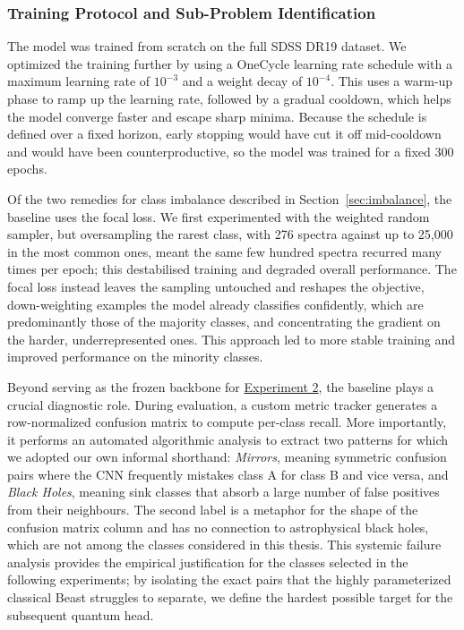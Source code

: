 \subsubsection{Training Protocol and Sub-Problem Identification}
\label{sec:baseline_training}

The model was trained from scratch on the full SDSS DR19 dataset. We optimized the training further by using a OneCycle learning rate \cite{smith2017onecyclelr} schedule with a maximum learning rate of $10^{-3}$ and a weight decay of $10^{-4}$. This uses a warm-up phase to ramp up the learning rate, followed by a gradual cooldown, which helps the model converge faster and escape sharp minima. Because the schedule is defined over a fixed horizon, early stopping would have cut it off mid-cooldown and would have been counterproductive, so the model was trained for a fixed 300 epochs.

Of the two remedies for class imbalance described in Section~\ref{sec:imbalance}, the
baseline uses the focal loss. We first experimented with the weighted random sampler, but
oversampling the rarest class, with 276 spectra against up to 25{,}000 in the most common
ones, meant the same few hundred spectra recurred many times per epoch; this destabilised
training and degraded overall performance. The focal loss
\cite{lin2018focalloss} instead leaves the sampling untouched and reshapes the objective,
down-weighting examples the model already classifies confidently, which are predominantly
those of the majority classes, and concentrating the gradient on the harder,
underrepresented ones. This approach led to more stable training and improved performance
on the minority classes.

Beyond serving as the frozen backbone for \hyperref[sec:exp2_methods]{Experiment 2}, the baseline plays a crucial diagnostic role. During evaluation, a custom metric tracker generates a row-normalized confusion matrix to compute per-class recall. More importantly, it performs an automated algorithmic analysis to extract two patterns for which we adopted our own informal shorthand: \emph{Mirrors}, meaning symmetric confusion pairs where the CNN frequently mistakes class A for class B and vice versa, and \emph{Black Holes}, meaning sink classes that absorb a large number of false positives from their neighbours. The second label is a metaphor for the shape of the confusion matrix column and has no connection to astrophysical black holes, which are not among the classes considered in this thesis. This systemic failure analysis provides the empirical justification for the classes selected in the following experiments; by isolating the exact pairs that the highly parameterized classical Beast struggles to separate, we define the hardest possible target for the subsequent quantum head.



